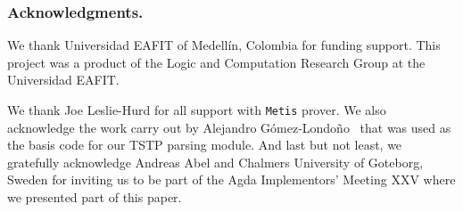 \documentclass[main.tex]{subfiles}
\begin{document}

\subsubsection*{Acknowledgments.}

We thank Universidad EAFIT of Medell\'in, Colombia for funding support.
This project was a product of the Logic and Computation Research
Group at the Universidad EAFIT.

We thank Joe Leslie-Hurd for all support with \verb!Metis! prover.
We also acknowledge the work carry out by Alejandro G\'omez-Londo\~no~
\cite{Gomez-Londono2015} that was used as the basis code for our TSTP parsing
module.
And last but not least, we gratefully acknowledge Andreas Abel and Chalmers
University of Goteborg, Sweden for inviting us to be part of the Agda
Implementors’ Meeting XXV where we presented part of this paper.
\end{document}
